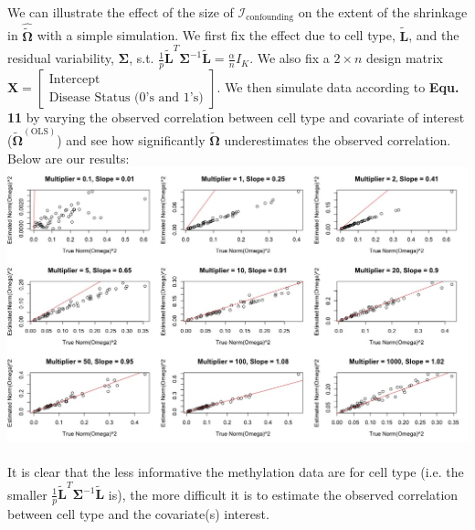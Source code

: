 \documentclass{article}
\begin{document}
\indent We can illustrate the effect of the size of $\mathcal{I}_{\text{confounding}}$ on the extent of the shrinkage in $\hat{\tilde{\bm{\Omega}}}$ with a simple simulation. We first fix the effect due to cell type, $\tilde{\bm{L}}$, and the residual variability, $\bm{\Sigma}$, s.t. $\frac{1}{p}\tilde{\bm{L}}^T \bm{\Sigma}^{-1}\tilde{\bm{L}} = \frac{\alpha}{n}I_K$. We also fix a $2 \times n$ design matrix $\bm{X} = \left[ \begin{matrix}
\text{Intercept}\\
\text{Disease Status (0's and 1's)}
\end{matrix} \right]$. We then simulate data according to \textbf{Equ. 11} by varying the observed correlation between cell type and covariate of interest ($\tilde{\bm{\Omega}}^{(\text{OLS})}$) and see how significantly $\hat{\tilde{\bm{\Omega}}}$ underestimates the observed correlation. Below are our results:\\
\includegraphics[scale=0.4]{UnderestimatingOmega_Multipliers.jpeg}\\
\\
It is clear that the less informative the methylation data are for cell type (i.e. the smaller $\frac{1}{p}\tilde{\bm{L}}^T \bm{\Sigma}^{-1}\tilde{\bm{L}}$ is), the more difficult it is to estimate the observed correlation between cell type and the covariate(s) interest.\\
\end{document}
